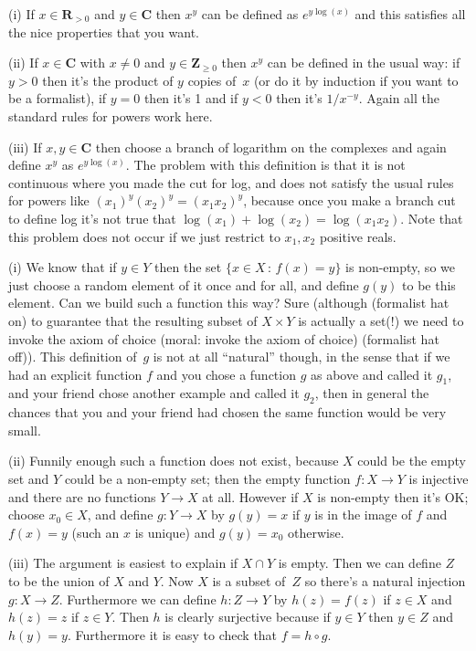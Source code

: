 \documentclass[10pt]{article}
\newcommand{\R}{\mathbf{R}}
\newcommand{\C}{\mathbf{C}}
\newcommand{\Z}{\mathbf{Z}}
\begin{document}
(i) If $x\in\R_{>0}$ and $y\in\C$ then $x^y$ can be defined as $e^{y\log(x)}$ and this satisfies all the nice properties that you want.

(ii) If $x\in\C$ with $x\not=0$ and $y\in\Z_{\geq0}$ then $x^y$ can be defined in the usual way: if $y>0$ then it's the product of $y$ copies of~$x$ (or do it by induction if you want to be a formalist), if $y=0$ then it's 1 and if $y<0$ then it's $1/x^{-y}$. Again all the standard rules for powers work here.

(iii) If $x,y\in\C$ then choose a branch of logarithm on the complexes and again define $x^y$ as $e^{y\log(x)}$. The problem with this definition is that it is not continuous where you made the cut for log, and does not satisfy the usual rules for powers like $(x_1)^y(x_2)^y=(x_1x_2)^y$, because once you make a branch cut to define log it's not true that $\log(x_1)+\log(x_2)=\log(x_1x_2)$. Note that this problem does not occur if we just restrict to $x_1,x_2$ positive reals.

\medskip{}

(i) We know that if $y\in Y$ then the set $\{x\in X\,:\,f(x)=y\}$ is non-empty, so we just choose a random element of it once and for all, and define $g(y)$ to be this element. Can we build such a function this way? Sure (although (formalist hat on) to guarantee that the resulting subset of $X\times Y$ is actually a set(!) we need to invoke the axiom of choice (moral: invoke the axiom of choice) (formalist hat off)). This definition of~$g$ is not at all ``natural'' though, in the sense that if we had an explicit function $f$ and you chose a function $g$ as above and called it $g_1$, and your friend chose another example and called it $g_2$, then in general the chances that you and your friend had chosen the same function would be very small.

(ii) Funnily enough such a function does not exist, because $X$ could be the empty set and $Y$ could be a non-empty set; then the empty function $f:X\to Y$ is injective and there are no functions $Y\to X$ at all. However if $X$ is non-empty then it's OK; choose $x_0\in X$, and define $g:Y\to X$ by $g(y)=x$ if $y$ is in the image of $f$ and $f(x)=y$ (such an $x$ is unique) and $g(y)=x_0$ otherwise.


(iii) The argument is easiest to explain if $X\cap Y$ is empty. Then we can define $Z$ to be the union of $X$ and $Y$. Now $X$ is a subset of~$Z$ so there's a natural injection $g:X\to Z$. Furthermore we can define $h:Z\to Y$ by $h(z)=f(z)$ if $z\in X$ and $h(z)=z$ if $z\in Y$. Then $h$ is clearly surjective because if $y\in Y$ then $y\in Z$ and $h(y)=y$. Furthermore it is easy to check that $f=h\circ g$.
\end{document}
